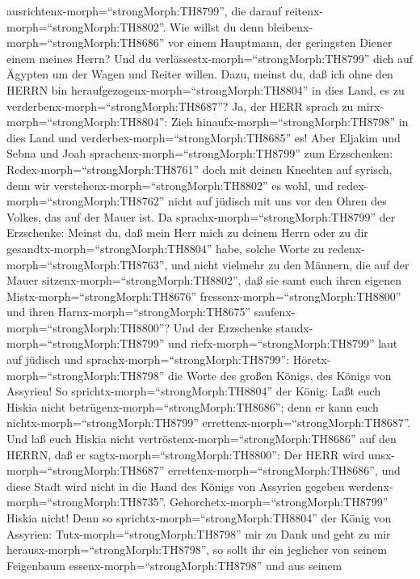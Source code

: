 ausrichtenx-morph=``strongMorph:TH8799'', die darauf
reitenx-morph=``strongMorph:TH8802''.  Wie willst du denn
bleibenx-morph=``strongMorph:TH8686'' vor einem Hauptmann, der
geringsten Diener einem meines Herrn? Und du
verlässestx-morph=``strongMorph:TH8799'' dich auf Ägypten um der Wagen
und Reiter willen.  Dazu, meinst du, daß ich ohne den HERRN
bin heraufgezogenx-morph=``strongMorph:TH8804'' in dies Land, es zu
verderbenx-morph=``strongMorph:TH8687''? Ja, der HERR sprach zu
mirx-morph=``strongMorph:TH8804'': Zieh
hinaufx-morph=``strongMorph:TH8798'' in dies Land und
verderbex-morph=``strongMorph:TH8685'' es!  Aber Eljakim
und Sebna und Joah sprachenx-morph=``strongMorph:TH8799'' zum
Erzschenken: Redex-morph=``strongMorph:TH8761'' doch mit deinen Knechten
auf syrisch, denn wir verstehenx-morph=``strongMorph:TH8802'' es wohl,
und redex-morph=``strongMorph:TH8762'' nicht auf jüdisch mit uns vor den
Ohren des Volkes, das auf der Mauer ist.  Da
sprachx-morph=``strongMorph:TH8799'' der Erzschenke: Meinst du, daß mein
Herr mich zu deinem Herrn oder zu dir
gesandtx-morph=``strongMorph:TH8804'' habe, solche Worte zu
redenx-morph=``strongMorph:TH8763'', und nicht vielmehr zu den Männern,
die auf der Mauer sitzenx-morph=``strongMorph:TH8802'', daß sie samt
euch ihren eigenen Mistx-morph=``strongMorph:TH8676''
fressenx-morph=``strongMorph:TH8800'' und ihren
Harnx-morph=``strongMorph:TH8675'' saufenx-morph=``strongMorph:TH8800''?
 Und der Erzschenke standx-morph=``strongMorph:TH8799'' und
riefx-morph=``strongMorph:TH8799'' laut auf jüdisch und
sprachx-morph=``strongMorph:TH8799'':
Höretx-morph=``strongMorph:TH8798'' die Worte des großen Königs, des
Königs von Assyrien!  So
sprichtx-morph=``strongMorph:TH8804'' der König: Laßt euch Hiskia nicht
betrügenx-morph=``strongMorph:TH8686''; denn er kann euch
nichtx-morph=``strongMorph:TH8799''
errettenx-morph=``strongMorph:TH8687''.  Und laß euch
Hiskia nicht vertröstenx-morph=``strongMorph:TH8686'' auf den HERRN, daß
er sagtx-morph=``strongMorph:TH8800'': Der HERR wird
unsx-morph=``strongMorph:TH8687''
errettenx-morph=``strongMorph:TH8686'', und diese Stadt wird nicht in
die Hand des Königs von Assyrien gegeben
werdenx-morph=``strongMorph:TH8735''. 
Gehorchetx-morph=``strongMorph:TH8799'' Hiskia nicht! Denn so
sprichtx-morph=``strongMorph:TH8804'' der König von Assyrien:
Tutx-morph=``strongMorph:TH8798'' mir zu Dank und geht zu mir
herausx-morph=``strongMorph:TH8798'', so sollt ihr ein jeglicher von
seinem Feigenbaum essenx-morph=``strongMorph:TH8798'' und aus seinem
